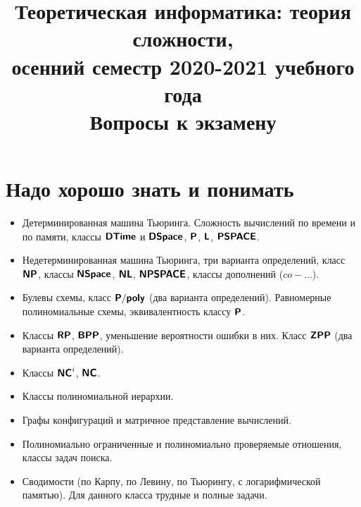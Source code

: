 \documentclass[11pt]{article}
\title{Теоретическая информатика: теория сложности,\\
	осенний семестр 2020-2021 учебного года\\
	Вопросы к экзамену
}
\begin{document}
\maketitle
\section{Надо хорошо знать и понимать}
\begin{itemize}[noitemsep]
	\item Детерминированная машина Тьюринга. Сложность вычислений по времени и по памяти, классы $\DTime$ и $\DSpace$, $\P$, $\L$, $\PSPACE$.
	\item Недетерминированная машина Тьюринга, три варианта определений, класс $\NP$, классы $\NSpace$, $\NL$, $\NPSPACE$, классы дополнений ($co-\ldots$).
	\item Булевы схемы, класс $\Ppoly$ (два варианта определений). Равномерные полиномиальные схемы, эквивалентность классу $\P$.
	\item Классы $\RP$, $\BPP$, уменьшение вероятности ошибки в них. Класс $\ZPP$ (два варианта определений).
	\item Классы $\NC^i$, $\NC$.
	\item Классы полиномиальной иерархии.
	\item Графы конфигураций и матричное представление вычислений.
	\item Полиномиально ограниченные и полиномиально проверяемые отношения, классы задач поиска.
	\item Сводимости (по Карпу, по Левину, по Тьюрингу, с логарифмической памятью). Для данного класса трудные и полные задачи.
\end{itemize}
\end{document}
